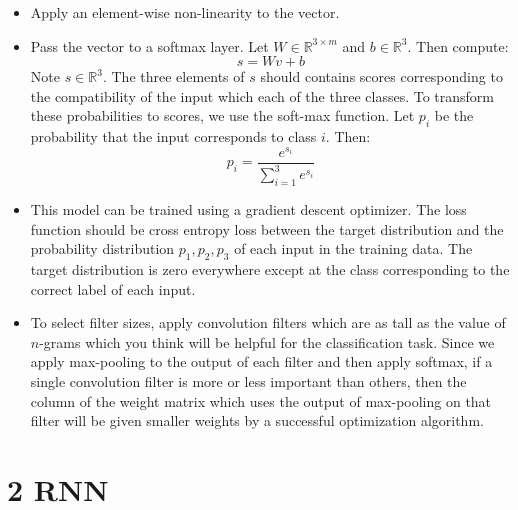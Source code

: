 \documentclass[a4paper]{article}
\begin{document}
\begin{itemize}
\item{Apply an element-wise non-linearity to the vector.}

\item{Pass the vector to a softmax layer. Let $W \in \mathbb{R}^{3 \times m}$ and $b \in \mathbb{R}^3$. 
Then compute:
$$s = Wv + b $$
Note $s \in \mathbb{R}^3$. The three elements of $s$ should contains scores corresponding to the compatibility of the input which each of the three classes. To transform these probabilities to scores, we use the soft-max function. Let $p_i$ be the probability that the input corresponds to class $i$. Then:
$$p_i  = \frac{e^{s_i}}{\sum_{i=1}^3 e^{s_i}}$$
}

\item{This model can be trained using a gradient descent optimizer. The loss function should be cross entropy loss between the target distribution and the probability distribution $p_1,p_2,p_3$ of each input in the training data. The target distribution is zero everywhere except at the class corresponding to the correct label of each input. }


\item{To select filter sizes, apply convolution filters which are as tall as the value of $n$-grams which you think will be helpful for the classification task. Since we apply max-pooling to the output of each filter and then apply softmax, if a single convolution filter is more or less important than others, then the column of the weight matrix which uses the output of max-pooling on that filter will be given smaller weights by a successful optimization algorithm.}

\end{itemize}

\section*{2 RNN}
\end{document}

